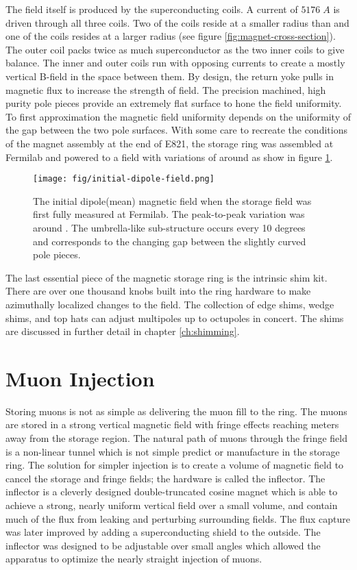 The field itself is produced by the superconducting coils.  A current of $5176\;A$ is driven through all three coils.  Two of the coils reside at a smaller radius than \rmagic and one of the coils resides at a larger radius (see figure \ref{fig:magnet-cross-section}).  The outer coil packs twice as much superconductor as the two inner coils to give balance.  The inner and outer coils run with opposing currents to create a mostly vertical B-field in the space between them.  By design, the return yoke pulls in magnetic flux to increase the strength of field.  The precision machined, high purity pole pieces provide an extremely flat surface to hone the field uniformity.  To first approximation the magnetic field uniformity depends on the uniformity of the gap between the two pole surfaces.  With some care to recreate the  conditions of the magnet assembly at the end of E821, the storage ring was assembled at Fermilab and powered to a field with variations of around  as show in figure \ref{fig:initial-field}.

\begin{figure}
\texttt{[image: fig/initial-dipole-field.png]}
\caption{The initial dipole(mean) magnetic field when the storage field was first fully measured at Fermilab.  The peak-to-peak variation was around .  The umbrella-like sub-structure occurs every 10 degrees and corresponds to the changing gap between the slightly curved pole pieces.}
\label{fig:initial-field}
\end{figure}

The last essential piece of the magnetic storage ring is the intrinsic shim kit.  There are over one thousand knobs built into the ring hardware to make azimuthally localized changes to the field.  The collection of edge shims, wedge shims, and top hats can adjust multipoles up to octupoles in concert.  The shims are discussed in further detail in chapter \ref{ch:shimming}.

\section{Muon Injection} \label{sec:muon-storage}

Storing muons is not as simple as delivering the muon fill to the ring.  The muons are stored in a strong vertical magnetic field with fringe effects reaching meters away from the storage region.  The natural path of muons through the fringe field is a non-linear tunnel which is not simple predict or manufacture in the storage ring.  The solution for simpler injection is to create a volume of magnetic field to cancel the storage and fringe fields; the hardware is called the inflector.  The inflector is a cleverly designed double-truncated cosine magnet which is able to achieve a strong, nearly uniform vertical field over a small volume, and contain much of the flux from leaking and perturbing surrounding fields.  The flux capture was later improved by adding a superconducting shield to the outside.  The inflector was designed to be adjustable over small angles which allowed the apparatus to optimize the nearly straight injection of muons. \cite{e821-prd}

